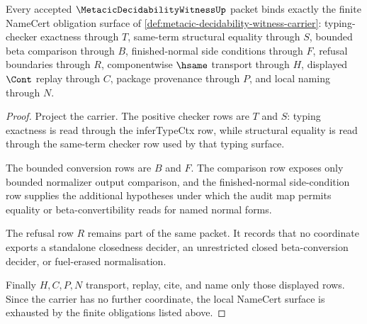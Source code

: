 \begin{theorem}
\label{thm:metacic-decidability-witness-namecert-obligations}
Every accepted $\MetacicDecidabilityWitnessUp$ packet binds exactly the finite NameCert obligation surface of \autoref{def:metacic-decidability-witness-carrier}: typing-checker exactness through $T$, same-term structural equality through $S$, bounded beta comparison through $B$, finished-normal side conditions through $F$, refusal boundaries through $R$, componentwise $\hsame$ transport through $H$, displayed $\Cont$ replay through $C$, package provenance through $P$, and local naming through $N$.
\end{theorem}
\begin{proof}
Project the carrier. The positive checker rows are $T$ and $S$: typing exactness is read through the inferTypeCtx row, while structural equality is read through the same-term checker row used by that typing surface.

The bounded conversion rows are $B$ and $F$. The comparison row exposes only bounded normalizer output comparison, and the finished-normal side-condition row supplies the additional hypotheses under which the audit map permits equality or beta-convertibility reads for named normal forms.

The refusal row $R$ remains part of the same packet. It records that no coordinate exports a standalone closedness decider, an unrestricted closed beta-conversion decider, or fuel-erased normalisation.

Finally $H,C,P,N$ transport, replay, cite, and name only those displayed rows. Since the carrier has no further coordinate, the local NameCert surface is exhausted by the finite obligations listed above.
\end{proof}

